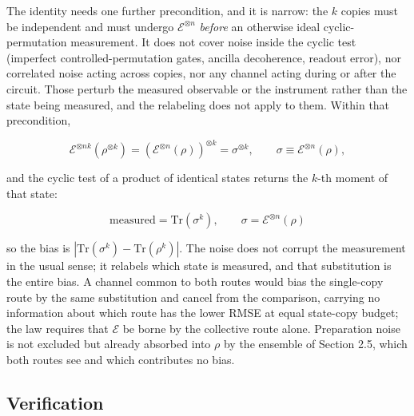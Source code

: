 \documentclass[a4paper,superscriptaddress,nofootinbib,onecolumn,nopdfoutputerror]{quantumarticle}
\begin{document}
The identity needs one further precondition, and it is narrow: the
\(k\) copies must be independent and must undergo
\(\mathcal{E}^{\otimes n}\) \emph{before} an otherwise ideal
cyclic-permutation measurement. It does not cover noise inside the
cyclic test (imperfect controlled-permutation gates, ancilla
decoherence, readout error), nor correlated noise acting across
copies, nor any channel acting during or after the circuit. Those
perturb the measured observable or the instrument rather than the state
being measured, and the relabeling does not apply to them. Within that
precondition,

\[\mathcal{E}^{\otimes nk}\!\left( \rho^{\otimes k} \right) = \left( \mathcal{E}^{\otimes n}(\rho) \right)^{\otimes k} = \sigma^{\otimes k}, \qquad \sigma \equiv \mathcal{E}^{\otimes n}(\rho),\]

and the cyclic test of a product of identical states returns the
\(k\)-th moment of that state:

\[\boxed{\;\text{measured} = \mathrm{Tr}(\sigma^k), \qquad \sigma = \mathcal{E}^{\otimes n}(\rho) \;}\]

so the bias is
\(\left| \mathrm{Tr}(\sigma^k) - \mathrm{Tr}(\rho^k) \right|\). The
noise does not corrupt the measurement in the usual sense; it relabels
which state is measured, and that substitution is the entire bias. A
channel common to both routes would bias the single-copy route by the
same substitution and cancel from the comparison, carrying no
information about which route has the lower RMSE at equal state-copy
budget; the law requires that \(\mathcal{E}\) be borne by the collective
route alone. Preparation noise is not excluded but already absorbed into
\(\rho\) by the ensemble of Section 2.5, which both routes see and which
contributes no bias.

\hypertarget{verification}{%
\subsection{Verification}\label{verification}}
\end{document}
